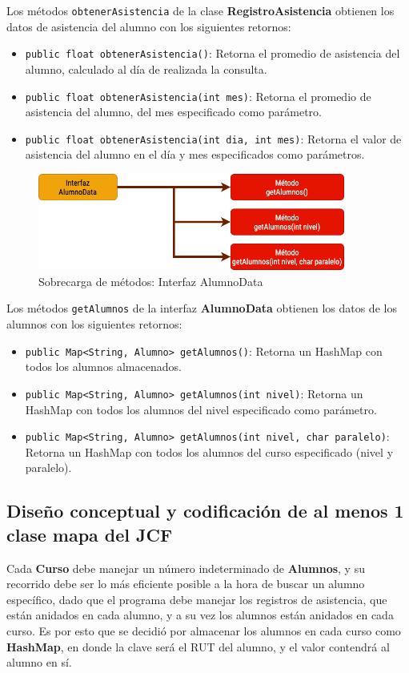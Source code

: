 Los métodos \texttt{obtenerAsistencia} de la clase \textbf{RegistroAsistencia} obtienen los datos de asistencia del alumno con los siguientes retornos:

\begin{itemize}
    \item \texttt{public float obtenerAsistencia()}: Retorna el promedio de asistencia del alumno, calculado al día de realizada la consulta.
    \item \texttt{public float obtenerAsistencia(int mes)}: Retorna el promedio de asistencia del alumno, del mes especificado como parámetro.
    \item \texttt{public float obtenerAsistencia(int dia, int mes)}: Retorna el valor de asistencia del alumno en el día y mes especificados como parámetros.
\end{itemize}

\begin{figure}[h]
    \centering
    \includegraphics[width=0.9\textwidth]{contents/img/img6}
    \caption{Sobrecarga de métodos: Interfaz AlumnoData}
    \label{fig:img6}
\end{figure}

Los métodos \texttt{getAlumnos} de la interfaz \textbf{AlumnoData} obtienen los datos de los alumnos con los siguientes retornos:

\begin{itemize}
    \item \texttt{public Map<String, Alumno> getAlumnos()}: Retorna un HashMap con todos los alumnos almacenados.
    \item \texttt{public Map<String, Alumno> getAlumnos(int nivel)}: Retorna un HashMap con todos los alumnos del nivel especificado como parámetro.
    \item \texttt{public Map<String, Alumno> getAlumnos(int nivel, char paralelo)}: Retorna un HashMap con todos los alumnos del curso especificado (nivel y paralelo).
\end{itemize}

\subsection{Diseño conceptual y codificación de al menos 1 clase mapa del JCF}

Cada \textbf{Curso} debe manejar un número indeterminado de \textbf{Alumnos}, y su recorrido debe ser lo más eficiente posible a la hora de buscar un alumno específico, dado que el programa debe manejar los registros de asistencia, que están anidados en cada alumno, y a su vez los alumnos están anidados en cada curso. Es por esto que se decidió por almacenar los alumnos en cada curso como \textbf{HashMap}, en donde la clave será el RUT del alumno, y el valor contendrá al alumno en sí.

